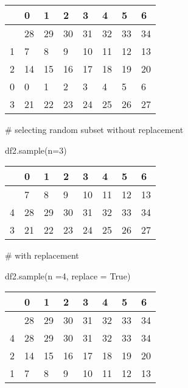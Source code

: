 \documentclass[
  letterpaper,
  DIV=11,
  numbers=noendperiod]{scrreprt}
\newenvironment{Shaded}{\begin{snugshade}}{\end{snugshade}}
\newcommand{\CommentTok}[1]{\textcolor[rgb]{0.37,0.37,0.37}{#1}}
\newcommand{\DecValTok}[1]{\textcolor[rgb]{0.68,0.00,0.00}{#1}}
\newcommand{\NormalTok}[1]{\textcolor[rgb]{0.00,0.23,0.31}{#1}}
\newcommand{\OperatorTok}[1]{\textcolor[rgb]{0.37,0.37,0.37}{#1}}
\newcommand{\VariableTok}[1]{\textcolor[rgb]{0.07,0.07,0.07}{#1}}
\begin{document}
\begin{longtable}[]{@{}llllllll@{}}
\toprule\noalign{}
& 0 & 1 & 2 & 3 & 4 & 5 & 6 \\
\midrule\noalign{}
\endhead
\bottomrule\noalign{}
\endlastfoot
4 & 28 & 29 & 30 & 31 & 32 & 33 & 34 \\
1 & 7 & 8 & 9 & 10 & 11 & 12 & 13 \\
2 & 14 & 15 & 16 & 17 & 18 & 19 & 20 \\
0 & 0 & 1 & 2 & 3 & 4 & 5 & 6 \\
3 & 21 & 22 & 23 & 24 & 25 & 26 & 27 \\
\end{longtable}

\begin{Shaded}
\begin{Highlighting}[]
\CommentTok{\# selecting random subset without replacement}

\NormalTok{df2.sample(n}\OperatorTok{=}\DecValTok{3}\NormalTok{)}
\end{Highlighting}
\end{Shaded}

\begin{longtable}[]{@{}llllllll@{}}
\toprule\noalign{}
& 0 & 1 & 2 & 3 & 4 & 5 & 6 \\
\midrule\noalign{}
\endhead
\bottomrule\noalign{}
\endlastfoot
1 & 7 & 8 & 9 & 10 & 11 & 12 & 13 \\
4 & 28 & 29 & 30 & 31 & 32 & 33 & 34 \\
3 & 21 & 22 & 23 & 24 & 25 & 26 & 27 \\
\end{longtable}

\begin{Shaded}
\begin{Highlighting}[]
\CommentTok{\# with replacement}

\NormalTok{df2.sample(n }\OperatorTok{=}\DecValTok{4}\NormalTok{, replace }\OperatorTok{=} \VariableTok{True}\NormalTok{)}
\end{Highlighting}
\end{Shaded}

\begin{longtable}[]{@{}llllllll@{}}
\toprule\noalign{}
& 0 & 1 & 2 & 3 & 4 & 5 & 6 \\
\midrule\noalign{}
\endhead
\bottomrule\noalign{}
\endlastfoot
4 & 28 & 29 & 30 & 31 & 32 & 33 & 34 \\
4 & 28 & 29 & 30 & 31 & 32 & 33 & 34 \\
2 & 14 & 15 & 16 & 17 & 18 & 19 & 20 \\
1 & 7 & 8 & 9 & 10 & 11 & 12 & 13 \\
\end{longtable}
\end{document}
